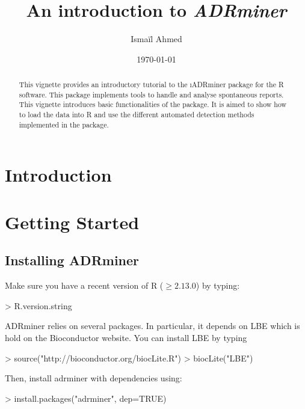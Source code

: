 \documentclass[a4paper]{article}
\title{An introduction to \textit{ADRminer}}
\author{Ismaïl Ahmed}
\date{\today}
\begin{document}


\maketitle

\begin{abstract}
This vignette provides an introductory tutorial to the \i{ADRminer} package for the R software. This package implements tools to handle and analyse spontaneous reports. This vignette introduces basic functionalities of the package. It is aimed to show how to load the data into R and use the different automated detection methods implemented in the package.
\end{abstract}

\section{Introduction}

\section{Getting Started}
\subsection{Installing ADRminer}

Make sure you have a recent version of R ($\geq 2.13.0$) by typing:
\begin{Schunk}
\begin{Sinput}
> R.version.string
\end{Sinput}
\end{Schunk}

ADRminer relies on several packages. In particular, it depends on LBE which is hold on the Bioconductor website. You can install LBE by typing 

\begin{Schunk}
\begin{Sinput}
> source("http://bioconductor.org/biocLite.R")
> biocLite("LBE")
\end{Sinput}
\end{Schunk}

Then, install adrminer with dependencies using:
\begin{Schunk}
\begin{Sinput}
> install.packages("adrminer", dep=TRUE)
\end{Sinput}
\end{Schunk}
\end{document}
